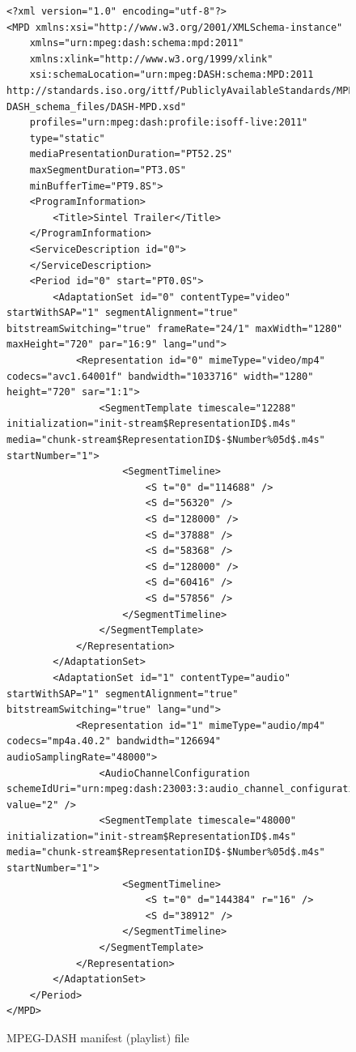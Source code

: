 \documentclass{article}
\begin{document}
\begin{figure}[H]
    \centering
    \lstset{
        language=XML,
        basicstyle=\ttfamily\footnotesize,
        breaklines=true,
        showstringspaces=false
    }
    \begin{lstlisting}
<?xml version="1.0" encoding="utf-8"?>
<MPD xmlns:xsi="http://www.w3.org/2001/XMLSchema-instance"
	xmlns="urn:mpeg:dash:schema:mpd:2011"
	xmlns:xlink="http://www.w3.org/1999/xlink"
	xsi:schemaLocation="urn:mpeg:DASH:schema:MPD:2011 http://standards.iso.org/ittf/PubliclyAvailableStandards/MPEG-DASH_schema_files/DASH-MPD.xsd"
	profiles="urn:mpeg:dash:profile:isoff-live:2011"
	type="static"
	mediaPresentationDuration="PT52.2S"
	maxSegmentDuration="PT3.0S"
	minBufferTime="PT9.8S">
	<ProgramInformation>
		<Title>Sintel Trailer</Title>
	</ProgramInformation>
	<ServiceDescription id="0">
	</ServiceDescription>
	<Period id="0" start="PT0.0S">
		<AdaptationSet id="0" contentType="video" startWithSAP="1" segmentAlignment="true" bitstreamSwitching="true" frameRate="24/1" maxWidth="1280" maxHeight="720" par="16:9" lang="und">
			<Representation id="0" mimeType="video/mp4" codecs="avc1.64001f" bandwidth="1033716" width="1280" height="720" sar="1:1">
				<SegmentTemplate timescale="12288" initialization="init-stream$RepresentationID$.m4s" media="chunk-stream$RepresentationID$-$Number%05d$.m4s" startNumber="1">
					<SegmentTimeline>
						<S t="0" d="114688" />
						<S d="56320" />
						<S d="128000" />
						<S d="37888" />
						<S d="58368" />
						<S d="128000" />
						<S d="60416" />
						<S d="57856" />
					</SegmentTimeline>
				</SegmentTemplate>
			</Representation>
		</AdaptationSet>
		<AdaptationSet id="1" contentType="audio" startWithSAP="1" segmentAlignment="true" bitstreamSwitching="true" lang="und">
			<Representation id="1" mimeType="audio/mp4" codecs="mp4a.40.2" bandwidth="126694" audioSamplingRate="48000">
				<AudioChannelConfiguration schemeIdUri="urn:mpeg:dash:23003:3:audio_channel_configuration:2011" value="2" />
				<SegmentTemplate timescale="48000" initialization="init-stream$RepresentationID$.m4s" media="chunk-stream$RepresentationID$-$Number%05d$.m4s" startNumber="1">
					<SegmentTimeline>
						<S t="0" d="144384" r="16" />
						<S d="38912" />
					</SegmentTimeline>
				</SegmentTemplate>
			</Representation>
		</AdaptationSet>
	</Period>
</MPD>
    \end{lstlisting}
    \caption{MPEG-DASH manifest (playlist) file}
    \label{fig:xml-content}
\end{figure}
\end{document}
